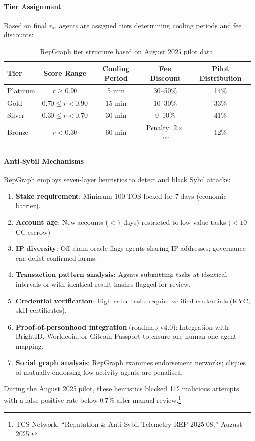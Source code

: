 \documentclass[11pt]{article}
\begin{document}
\paragraph{Tier Assignment} Based on final $r_a$, agents are assigned tiers determining cooling periods and fee discounts:
\begin{longtable}{@{}lcccc@{}}
\toprule
\textbf{Tier} & \textbf{Score Range} & \textbf{Cooling Period} & \textbf{Fee Discount} & \textbf{Pilot Distribution} \\\midrule
Platinum & $r \geq 0.90$ & 5 min & 30--50\% & 14\% \\
Gold & $0.70 \leq r < 0.90$ & 15 min & 10--30\% & 33\% \\
Silver & $0.30 \leq r < 0.70$ & 30 min & 0--10\% & 41\% \\
Bronze & $r < 0.30$ & 60 min & Penalty: $2 \times$ fee & 12\% \\\bottomrule
\caption{RepGraph tier structure based on August 2025 pilot data.}
\label{tab:reputation-tiers}
\end{longtable}

\paragraph{Anti-Sybil Mechanisms} RepGraph employs seven-layer heuristics to detect and block Sybil attacks:
\begin{enumerate}[noitemsep]
  \item \textbf{Stake requirement}: Minimum 100 TOS locked for 7 days (economic barrier).
  \item \textbf{Account age}: New accounts ($<7$ days) restricted to low-value tasks ($<10$ CC escrow).
  \item \textbf{IP diversity}: Off-chain oracle flags agents sharing IP addresses; governance can delist confirmed farms.
  \item \textbf{Transaction pattern analysis}: Agents submitting tasks at identical intervals or with identical result hashes flagged for review.
  \item \textbf{Credential verification}: High-value tasks require verified credentials (KYC, skill certificates).
  \item \textbf{Proof-of-personhood integration} (roadmap v4.0): Integration with BrightID, Worldcoin, or Gitcoin Passport to ensure one-human-one-agent mapping.
  \item \textbf{Social graph analysis}: RepGraph examines endorsement networks; cliques of mutually endorsing low-activity agents are penalised.
\end{enumerate}
During the August 2025 pilot, these heuristics blocked 112 malicious attempts with a false-positive rate below 0.7\% after manual review.\footnote{TOS Network, ``Reputation \& Anti-Sybil Telemetry REP-2025-08,'' August 2025.}
\end{document}
